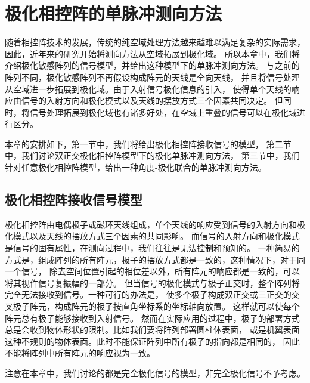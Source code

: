 \documentclass[master]{thesis-uestc}
\begin{document}
\chapter{极化相控阵的单脉冲测向方法}
随着相控阵技术的发展，传统的纯空域处理方法越来越难以满足复杂的实际需求，因此，近年来的研究开始将测向方法从空域拓展到极化域。
所以本章中，我们将介绍极化敏感阵列的信号模型，并给出这种模型下的单脉冲测向方法。
与之前的阵列不同，极化敏感阵列不再假设构成阵元的天线是全向天线，
并且将信号处理从空域进一步拓展到极化域。由于入射信号极化信息的引入，
使得单个天线的响应由信号的入射方向和极化模式以及天线的摆放方式三个因素共同决定。
但同时，将信号处理拓展到极化域也有诸多好处，在空域上重叠的信号可以在极化域进行区分。

本章的安排如下，第一节中，我们将给出极化相控阵接收信号的模型，
第二节中，我们讨论双正交极化相控阵模型下的极化单脉冲测向方法，
第三节中，我们针对任意极化相控阵模型，给出一种角度-极化联合的单脉冲测向方法。

\section{极化相控阵接收信号模型}
极化相控阵由电偶极子或磁环天线组成，单个天线的响应受到信号的入射方向和极化模式以及天线的摆放方式三个因素的共同影响。
而信号的入射方向和极化模式是信号的固有属性，在测向过程中，我们往往是无法控制和预知的。
一种简易的方式是，组成阵列的所有阵元，极子的摆放方式都是一致的，这种情况下，对于同一个信号，
除去空间位置引起的相位差以外，所有阵元的响应都是一致的，可以将其视作信号复振幅的一部分。
但当信号的极化模式与极子正交时，整个阵列将完全无法接收到信号。一种可行的办法是，
使多个极子构成双正交或三正交的交叉极子阵元，构成阵元的极子按直角坐标系的坐标轴向放置。
这样就可以使每个阵元总有极子能够接收到入射信号。
然而在实际应用的过程中，极子的部署方式总是会收到物体形状的限制。比如我们要将阵列部署圆柱体表面，
或是机翼表面这种不规则的物体表面。此时不能保证阵列中所有极子的指向都是相同的，
因此不能将阵列中所有阵元的响应视为一致。

注意在本章中，我们讨论的都是完全极化信号的模型，非完全极化信号不予考虑。
\end{document}
